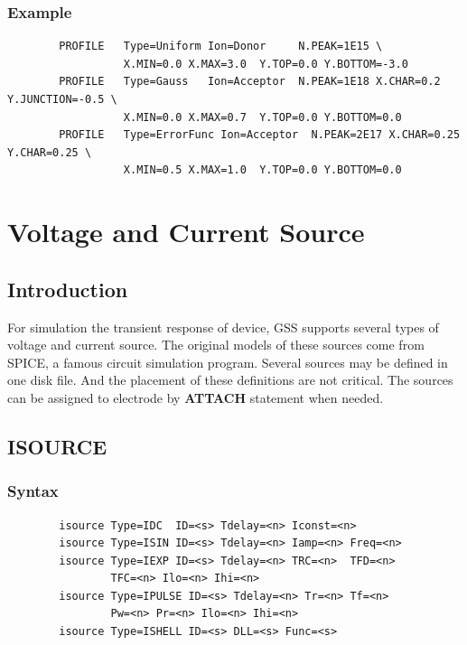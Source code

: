 \documentclass[11pt,pdftex]{article}
\begin{document}
\subsubsection*{Example}
\begin{verbatim}
        PROFILE   Type=Uniform Ion=Donor     N.PEAK=1E15 \
                  X.MIN=0.0 X.MAX=3.0  Y.TOP=0.0 Y.BOTTOM=-3.0
        PROFILE   Type=Gauss   Ion=Acceptor  N.PEAK=1E18 X.CHAR=0.2 Y.JUNCTION=-0.5 \
                  X.MIN=0.0 X.MAX=0.7  Y.TOP=0.0 Y.BOTTOM=0.0
        PROFILE   Type=ErrorFunc Ion=Acceptor  N.PEAK=2E17 X.CHAR=0.25 Y.CHAR=0.25 \
                  X.MIN=0.5 X.MAX=1.0  Y.TOP=0.0 Y.BOTTOM=0.0
\end{verbatim}


\newpage
\section{Voltage and Current Source}
\subsection{Introduction}
For simulation the transient response of device, GSS supports
several types of voltage and current source. The original models of
these sources come from SPICE, a famous circuit simulation program.
Several sources may be defined in one disk file. And the placement
of these definitions are not critical. The sources can be assigned
to electrode by \textbf{ATTACH} statement when needed.

\subsection{ISOURCE}

\subsubsection*{Syntax}
\begin{verbatim}
        isource Type=IDC  ID=<s> Tdelay=<n> Iconst=<n>
        isource Type=ISIN ID=<s> Tdelay=<n> Iamp=<n> Freq=<n>
        isource Type=IEXP ID=<s> Tdelay=<n> TRC=<n>  TFD=<n>
                TFC=<n> Ilo=<n> Ihi=<n>
        isource Type=IPULSE ID=<s> Tdelay=<n> Tr=<n> Tf=<n>
                Pw=<n> Pr=<n> Ilo=<n> Ihi=<n>
        isource Type=ISHELL ID=<s> DLL=<s> Func=<s>
\end{verbatim}
\end{document}
